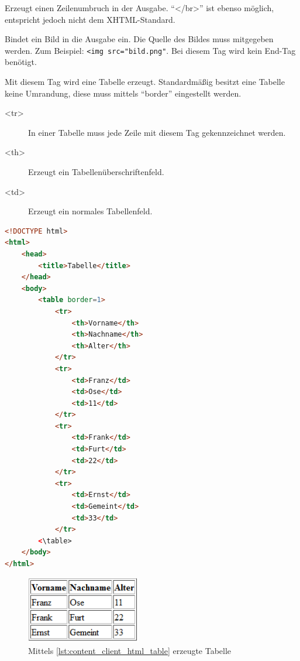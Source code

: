 \begin{description}
\begin{description} [style=nextline]
\item[<br />] Erzeugt einen Zeilenumbruch in der Ausgabe. \enquote{</br>} ist ebenso möglich, entspricht jedoch nicht dem XHTML-Standard.
\item[<img>] Bindet ein Bild in die Ausgabe ein. Die Quelle des Bildes muss mitgegeben werden. Zum Beispiel: \texttt{<img src="bild.png"}. Bei diesem Tag wird kein End-Tag benötigt.
\item[<table>] Mit diesem Tag wird eine Tabelle erzeugt. Standardmäßig besitzt eine Tabelle keine Umrandung, diese muss mittels \enquote{border} eingestellt werden.
\begin{description}
\item[<tr>] In einer Tabelle muss jede Zeile mit diesem Tag gekennzeichnet werden.
\item[<th>] Erzeugt ein Tabellenüberschriftenfeld.
\item[<td>] Erzeugt ein normales Tabellenfeld.
\end{description}
\end{description}
\end{description}
\begin{lstlisting}[style=custom, language=HTML, caption={HTML-Tabelle}, label={lst:content_client_html_table}]
<!DOCTYPE html>
<html>
	<head>
		<title>Tabelle</title>
	</head>
	<body>
		<table border=1> 
			<tr>
				<th>Vorname</th>
				<th>Nachname</th>
				<th>Alter</th>
			</tr>
			<tr>
				<td>Franz</td>
				<td>Ose</td>
				<td>11</td>
			</tr>
			<tr>
				<td>Frank</td>
				<td>Furt</td>
				<td>22</td>
			</tr>
			<tr>
				<td>Ernst</td>
				<td>Gemeint</td>
				<td>33</td>
			</tr>
		<\table>
	</body>
</html>
\end{lstlisting}

\begin{figure}[H]
\centering
\includegraphics[keepaspectratio=true, width=5cm]{images/screenshots/html_table.png}
\caption{Mittels \autoref{lst:content_client_html_table} erzeugte Tabelle}
\label{fig:content_html_table}
\end{figure}

